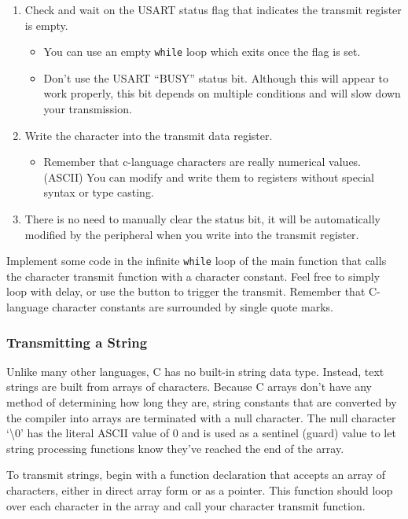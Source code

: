 \documentclass[openany,11pt,fleqn]{book} %
\begin{document}
\begin{enumerate}
 \item Check and wait on the USART status flag that indicates the transmit register is empty.
 \begin{itemize}
     \item You can use an empty \texttt{while} loop which exits once the flag is set. 
     \item Don't use the USART ``BUSY'' status bit. Although this will appear to work properly, this bit depends on multiple conditions and will slow down your transmission. 
 \end{itemize}
 \item Write the character into the transmit data register. 
 \begin{itemize}
     \item Remember that c-language characters are really numerical values. (ASCII) You can modify and write them to registers without special syntax or type casting.  
 \end{itemize}
 \item There is no need to manually clear the status bit, it will be automatically modified by the peripheral when you write into the transmit register.
\end{enumerate}

Implement some code in the infinite \texttt{while} loop of the main function that calls the character transmit function with a character constant. Feel free to simply loop with delay, or use the button to trigger the transmit. Remember that C-language character constants are surrounded by single quote marks.

\subsubsection{Transmitting a String}
Unlike many other languages, C has no built-in string data type. Instead, text strings are built from arrays of characters. Because C arrays don't have any method of determining how long they are, string constants that are converted by the compiler into arrays are terminated with a null character. The null character `{\textbackslash}0' has the literal ASCII value of 0 and is used as a sentinel (guard) value to let string processing functions know they've reached the end of the array. 

To transmit strings, begin with a function declaration that accepts an array of characters, either in direct array form or as a pointer. This function should loop over each character in the array and call your character transmit function. 
\end{document}
